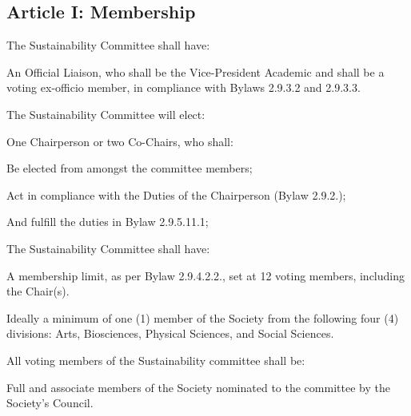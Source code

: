\subsection{Article I: Membership}
\begin{longenum}[ label*=\thesubsection.\arabic*., align=left] 
\item The Sustainability Committee shall have:
	\begin{longenum}[ label*=\arabic*., align=left]
	\item An Official Liaison, who shall be the Vice-President Academic and shall be a voting ex-officio member, in compliance with Bylaws 2.9.3.2 and 2.9.3.3.
	\end{longenum}
\item The Sustainability Committee will elect:
	\begin{longenum}[ label*=\arabic*., align=left]
	\item One Chairperson or two Co-Chairs, who shall:
		\begin{longenum}[ label*=\arabic*., align=left]
		\item Be elected from amongst the committee members;
		\item Act in compliance with the Duties of the Chairperson (Bylaw 2.9.2.);
		\item And fulfill the duties in Bylaw 2.9.5.11.1;
		\end{longenum}
	\end{longenum}
\item The Sustainability Committee shall have:
	\begin{longenum}[ label*=\arabic*., align=left]
	\item A membership limit, as per Bylaw 2.9.4.2.2., set at 12 voting members, including the Chair(s).
	\item Ideally a minimum of one (1) member of the Society from the following four (4) divisions: Arts, Biosciences, Physical Sciences, and Social Sciences.
	\end{longenum}
\item All voting members of the Sustainability committee shall be:
	\begin{longenum}[ label*=\arabic*., align=left]
	\item Full and associate members of the Society nominated to the committee by the Society’s Council.  
	\end{longenum}
\end{longenum}

